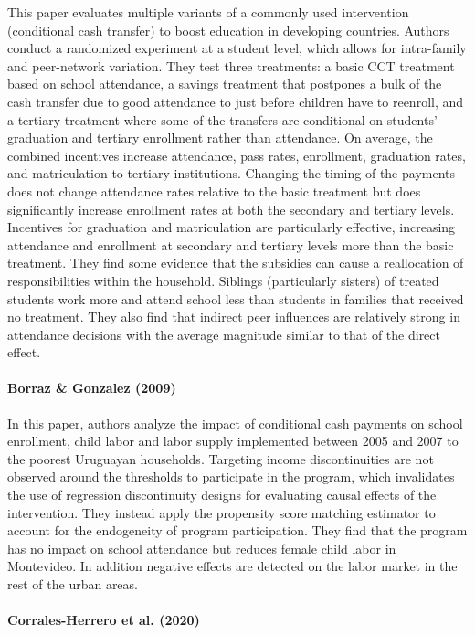 \documentclass[a4paper, 10pt]{article}
\begin{document}
This paper evaluates multiple variants of a commonly used intervention (conditional cash transfer) to boost education in developing countries. Authors conduct a randomized experiment at a student level, which allows for intra-family and peer-network variation. They test three treatments: a basic CCT treatment based on school attendance, a savings treatment that postpones a bulk of the cash transfer due to good attendance to just before children have to reenroll, and a tertiary treatment where some of the transfers are conditional on students' graduation and tertiary enrollment rather than attendance. On average, the combined incentives increase attendance, pass rates, enrollment, graduation rates, and matriculation to tertiary institutions. Changing the timing of the payments does not change attendance rates relative to the basic treatment but does significantly increase enrollment rates at both the secondary and tertiary levels. Incentives for graduation and matriculation are particularly effective, increasing attendance and enrollment at secondary and tertiary levels more than the basic treatment. They find some evidence that the subsidies can cause a reallocation of responsibilities within the household. Siblings (particularly sisters) of treated students work more and attend school less than students in families that received no treatment. They also find that indirect peer influences are relatively strong in attendance decisions with the average magnitude similar to that of the direct effect.

\paragraph{Borraz \& Gonzalez (2009)}

In this paper, authors analyze the impact of conditional cash payments on school enrollment, child labor and labor supply implemented between 2005 and 2007 to the poorest Uruguayan households. Targeting income discontinuities are not observed around the thresholds to participate in the program, which invalidates the use of regression discontinuity designs for evaluating causal effects of the intervention. They instead apply the propensity score matching estimator to account for the endogeneity of program participation. They find that the program has no impact on school attendance but reduces female child labor in Montevideo. In addition negative effects are detected on the labor market in the rest of the urban areas.

\paragraph{Corrales-Herrero et al. (2020)}
\end{document}
